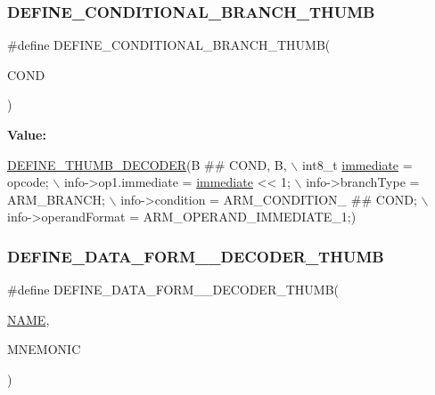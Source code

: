 \subsubsection{\texorpdfstring{D\+E\+F\+I\+N\+E\+\_\+\+C\+O\+N\+D\+I\+T\+I\+O\+N\+A\+L\+\_\+\+B\+R\+A\+N\+C\+H\+\_\+\+T\+H\+U\+MB}{DEFINE\_CONDITIONAL\_BRANCH\_THUMB}}
{\footnotesize\ttfamily \#define D\+E\+F\+I\+N\+E\+\_\+\+C\+O\+N\+D\+I\+T\+I\+O\+N\+A\+L\+\_\+\+B\+R\+A\+N\+C\+H\+\_\+\+T\+H\+U\+MB(\begin{DoxyParamCaption}\item[{}]{C\+O\+ND }\end{DoxyParamCaption})}

{\bfseries Value\+:}
\begin{DoxyCode}
\mbox{\hyperlink{decoder-thumb_8c_a44d34ec3fd7c2c2ee51ff5966678c86e}{DEFINE\_THUMB\_DECODER}}(B ## COND, B, \(\backslash\)
        int8\_t \mbox{\hyperlink{decoder-thumb_8c_a5fa4c1a4173190a0769b8b390dc82ac3}{immediate}} = opcode; \(\backslash\)
        info->op1.immediate = \mbox{\hyperlink{decoder-thumb_8c_a5fa4c1a4173190a0769b8b390dc82ac3}{immediate}} << 1; \(\backslash\)
        info->branchType = ARM\_BRANCH; \(\backslash\)
        info->condition = ARM\_CONDITION\_ ## COND; \(\backslash\)
        info->operandFormat = ARM\_OPERAND\_IMMEDIATE\_1;)
\end{DoxyCode}
\mbox{\label{decoder-thumb_8c_a172d2735fdfd8af9a99ae5573bae8e15}} 
\subsubsection{\texorpdfstring{D\+E\+F\+I\+N\+E\+\_\+\+D\+A\+T\+A\+\_\+\+F\+O\+R\+M\+\_\+\_\+\+D\+E\+C\+O\+D\+E\+R\+\_\+\+T\+H\+U\+MB}{DEFINE\_DATA\_FORM\_1\_DECODER\_THUMB}}
{\footnotesize\ttfamily \#define D\+E\+F\+I\+N\+E\+\_\+\+D\+A\+T\+A\+\_\+\+F\+O\+R\+M\+\_\+\_\+\+D\+E\+C\+O\+D\+E\+R\+\_\+\+T\+H\+U\+MB(\begin{DoxyParamCaption}\item[{}]{\mbox{\hyperlink{inflate_8h_a164ea0159d5f0b5f12a646f25f99eceaa67bc2ced260a8e43805d2480a785d312}{N\+A\+ME}},  }\item[{}]{M\+N\+E\+M\+O\+N\+IC }\end{DoxyParamCaption})}

